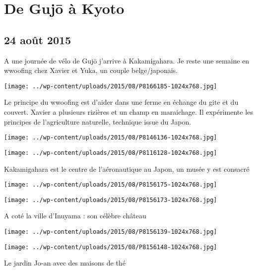 \chapter{De Gujō à Kyoto}
\section*{24 août 2015}
A une journée de vélo de Gujō j'arrive à Kakamigahara. Je reste une semaine en wwoofing chez Xavier et Yuka, un couple belge/japonais. \newline
 \newline
\centerline{\texttt{[image: ../wp-content/uploads/2015/08/P8166185-1024x768.jpg]} } 
 \newline
 Le principe du wwoofing est d'aider dans une ferme en échange du gite et du couvert. \newline
 Xavier a plusieurs rizières et un champ en maraichage. Il expérimente les principes de l'agriculture naturelle, technique issue du Japon. \newline
 \newline
\centerline{\texttt{[image: ../wp-content/uploads/2015/08/P8146136-1024x768.jpg]} } 
 \newline
 \newline
\centerline{\texttt{[image: ../wp-content/uploads/2015/08/P8116128-1024x768.jpg]} } 
 \newline
 Kakamigahara est le centre de l'aéronautique au Japon, un musée y est consacré \newline
 \newline
\centerline{\texttt{[image: ../wp-content/uploads/2015/08/P8156175-1024x768.jpg]} } 
 \newline
 \newline
\centerline{\texttt{[image: ../wp-content/uploads/2015/08/P8156173-1024x768.jpg]} } 
 \newline
 A coté la ville d'Inuyama : son célèbre château \newline
 \newline
\centerline{\texttt{[image: ../wp-content/uploads/2015/08/P8156139-1024x768.jpg]} } 
 \newline
 \newline
\centerline{\texttt{[image: ../wp-content/uploads/2015/08/P8156148-1024x768.jpg]} } 
 \newline
 Le jardin Jo-an avec des maisons de thé \newline
 \newline
